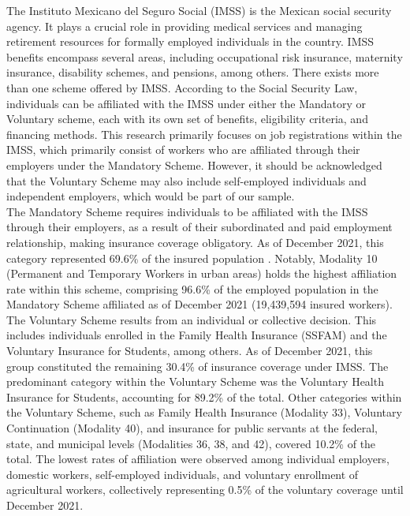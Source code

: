 \documentclass[10pt, oneside]{book}
\begin{document}
The Instituto Mexicano del Seguro Social (IMSS) is the Mexican social security agency. It plays a crucial role in providing medical services and managing retirement resources for formally employed individuals in the country. IMSS benefits encompass several areas, including occupational risk insurance, maternity insurance, disability schemes, and pensions, among others. There exists more than one scheme offered by IMSS. According to the Social Security Law, individuals can be affiliated with the IMSS under either the Mandatory or Voluntary scheme, each with its own set of benefits, eligibility criteria, and financing methods. This research primarily focuses on job registrations within the IMSS, which primarily consist of workers who are affiliated through their employers under the Mandatory Scheme. However, it should be acknowledged that the Voluntary Scheme may also include self-employed individuals and independent employers, which would be part of our sample. \\

The Mandatory Scheme requires individuals to be affiliated with the IMSS through their employers, as a result of their subordinated and paid employment relationship, making insurance coverage obligatory. As of December 2021, this category represented 69.6\% of the insured population \citep{IMSS22}. Notably, Modality 10 (Permanent and Temporary Workers in urban areas) holds the highest affiliation rate within this scheme, comprising 96.6\% of the employed population in the Mandatory Scheme affiliated as of December 2021 (19,439,594 insured workers). \\

The Voluntary Scheme results from an individual or collective decision. This includes individuals enrolled in the Family Health Insurance (SSFAM) and the Voluntary Insurance for Students, among others. As of December 2021, this group constituted the remaining 30.4\% of insurance coverage under IMSS. The predominant category within the Voluntary Scheme was the Voluntary Health Insurance for Students, accounting for 89.2\% of the total. Other categories within the Voluntary Scheme, such as Family Health Insurance (Modality 33), Voluntary Continuation (Modality 40), and insurance for public servants at the federal, state, and municipal levels (Modalities 36, 38, and 42), covered 10.2\% of the total. The lowest rates of affiliation were observed among individual employers, domestic workers, self-employed individuals, and voluntary enrollment of agricultural workers, collectively representing 0.5\% of the voluntary coverage until December 2021. \\
\end{document}
